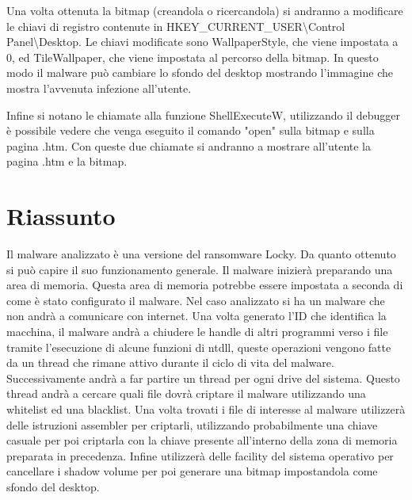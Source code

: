 \documentclass[a4paper,12pt]{article}
\begin{document}
Una volta ottenuta la bitmap (creandola o ricercandola) si andranno a modificare le chiavi di registro contenute in  HKEY\_CURRENT\_USER\textbackslash Control Panel\textbackslash Desktop. Le chiavi modificate sono WallpaperStyle, che viene impostata a 0, ed TileWallpaper, che viene impostata al percorso della bitmap. In questo modo il malware può cambiare lo sfondo del desktop mostrando l'immagine che mostra l'avvenuta infezione all'utente. 

Infine si notano le chiamate alla funzione ShellExecuteW, utilizzando il debugger è possibile vedere che venga eseguito il comando "open" sulla bitmap e sulla pagina .htm. Con queste due chiamate si andranno a mostrare all'utente la pagina .htm e la bitmap.

\section{Riassunto}
Il malware analizzato è una versione del ransomware Locky. Da quanto ottenuto si può capire il suo funzionamento generale. Il malware inizierà preparando una area di memoria. Questa area di memoria potrebbe essere impostata a seconda di come è stato configurato il malware. Nel caso analizzato si ha un malware che non andrà a comunicare con internet. Una volta generato l'ID che identifica la macchina, il malware andrà a chiudere le handle di altri programmi verso i file tramite l'esecuzione di alcune funzioni di ntdll, queste operazioni vengono fatte da un thread che rimane attivo durante il ciclo di vita del malware. Successivamente andrà a far partire un thread per ogni drive del sistema. Questo thread andrà a cercare quali file dovrà criptare il malware utilizzando una whitelist ed una blacklist. Una volta trovati i file di interesse al malware utilizzerà delle istruzioni assembler per criptarli, utilizzando probabilmente una chiave casuale per poi criptarla con la chiave presente all'interno della zona di memoria preparata in precedenza. Infine utilizzerà delle facility del sistema operativo per cancellare i shadow volume per poi generare una bitmap impostandola come sfondo del desktop. 
\end{document}
